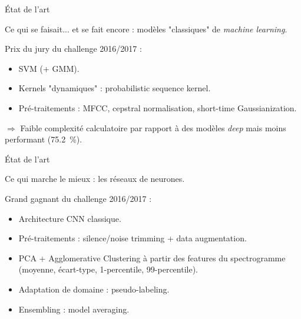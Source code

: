 \documentclass[compress,xcolor=table]{beamer}
\begin{document}
\begin{frame}{État de l'art}

    Ce qui se faisait... et se fait encore : modèles "classiques" de \textit{machine learning}.

    Prix du jury du challenge 2016/2017 :

    \begin{exampleblock}{ \cite{thakurRapidBirdActivity2017}}

        \begin{itemize}
            \item SVM (+ GMM).
            \item Kernels "dynamiques" : probabilistic sequence kernel.
            \item Pré-traitements : MFCC, cepstral normalisation, short-time Gaussianization.
        \end{itemize}

        $\Rightarrow$ Faible complexité calculatoire par rapport à des modèles \textit{deep} mais moins performant (75.2~\%).

    \end{exampleblock}

\end{frame}


\begin{frame}{État de l'art}

    Ce qui marche le mieux : les réseaux de neurones.

    Grand gagnant du challenge 2016/2017 :

    \begin{exampleblock}{ \cite{grillTwoConvolutionalNeural2017}}

        \begin{itemize}
            \item Architecture CNN classique.
            \item Pré-traitements : silence/noise trimming + data augmentation.
            \item PCA + Agglomerative Clustering à partir des features du spectrogramme (moyenne, écart-type, 1-percentile, 99-percentile).
            \item Adaptation de domaine : pseudo-labeling.
            \item Ensembling : model averaging.
        \end{itemize}

    \end{exampleblock}

\end{frame}
\end{document}
